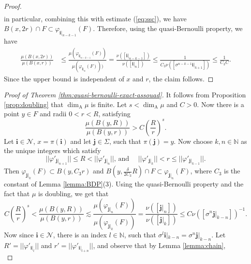 \documentclass{PRM}
\newcommand{\field}[1]{\mathbb{#1}}
\newcommand{\N}{\field{N}}
\theoremstyle{plain}
\theoremstyle{definition}
\theoremstyle{remark}
\begin{document}
\begin{proof}
\begin{align*}
\end{align*}
in particular, combining this with estimate (\ref{eq:ssc}), we have $B(x,2r)\cap F\subset \varphi_{\mathbf{i}|_{n-k-1}}(F)$. Therefore, using the quasi-Bernoulli property, we have
\begin{align*}
    \frac{\mu(B(x,2r))}{\mu(B(x,r))}&\leq \frac{\mu(\varphi_{\mathbf{i}|_{n-k-1}}(F))}{\mu(\varphi_{\mathbf{i}|_{n}}(F)))}=\frac{\nu([\mathbf{i}|_{n-k-1}])}{\nu([\mathbf{i}|_{n}])}\leq \frac{1}{C_3\nu([\sigma^{n-k-1}\mathbf{i}|_{k+1}])}\leq \frac{1}{C_3C}.
\end{align*}
Since the upper bound is independent of $x$ and $r$, the claim follows.
\end{proof}

\begin{proof}[Proof of Theorem \ref{thm:quasi-bernoulli-exact-assouad}]
It follows from Proposition \ref{prop:doubling} that $\dim_{\mathrm{A}}\mu$ is finite. Let $s<\dim_{\mathrm{A}}\mu$ and $C>0$.
Now there is a point $y\in F$ and radii $0<r<R$, satisfying
\begin{equation*}
    \frac{\mu(B(y,R))}{\mu(B(y,r))}> C\left(\frac{R}{r}\right)^s.
\end{equation*}
Let $\mathbf{i}\in \mathcal{N}$, $x=\pi(\mathbf{i})$ and let $\mathbf{j}\in\Sigma$, such that $\pi(\mathbf{j})=y$.  Now choose $k,n\in\N$ as the unique integers which satisfy
\begin{equation*}
    ||\varphi'_{\mathbf{j}|_{n+1}}||\leq R < ||\varphi'_{\mathbf{j}|_{n}}|| \text{, and }\quad ||\varphi'_{\mathbf{j}|_{k}}||< r \leq ||\varphi'_{\mathbf{j}|_{k-1}}||.
\end{equation*} Then $\varphi_{\mathbf{j}|_k}(F)\subset B(y,C_3r)$ and $B(y,\frac{\delta}{2C_3}R)\cap F\subset \varphi_{\mathbf{j}|_n}(F)$, where $C_3$ is the constant of Lemma \ref{lemma:BDP}(3). Using the quasi-Bernoulli property and the fact that $\mu$ is doubling, we get that
\begin{equation*}
    C\left(\frac{R}{r}\right)^s<\frac{\mu(B(y,R))}{\mu(B(y,r))}\lesssim \frac{\mu(\varphi_{\mathbf{j}|_n}(F))}{\mu(\varphi_{\mathbf{j}|_k}(F))}=\frac{\nu([\mathbf{j}|_n])}{\nu([\mathbf{j}|_k])}\leq C\nu([\sigma^{n}\mathbf{j}|_{k-n}])^{-1}.
\end{equation*}
Now since $\mathbf{i}\in \mathcal{N}$, there is an index $l\in\N$, such that $\sigma^l\mathbf{i}|_{k-n}=\sigma^{n}\mathbf{j}|_{k-n}$. Let $R'=||\varphi'_{\mathbf{i}|_{l}}||$ and $r'= ||\varphi'_{\mathbf{i}|_{l+n}}||$, and observe that by Lemma \ref{lemma:chain},
\begin{equation*}

\end{equation*}
\end{proof}
\end{document}
